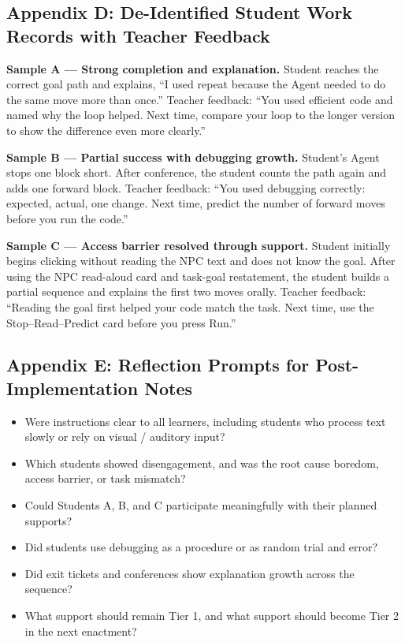 \documentclass[12pt]{article}
\begin{document}
\subsection{Appendix D: De-Identified Student Work Records with Teacher Feedback}
\textbf{Sample A --- Strong completion and explanation.} Student reaches the correct goal path and explains, ``I used repeat because the Agent needed to do the same move more than once.'' Teacher feedback: ``You used efficient code and named why the loop helped. Next time, compare your loop to the longer version to show the difference even more clearly.''

\textbf{Sample B --- Partial success with debugging growth.} Student's Agent stops one block short. After conference, the student counts the path again and adds one forward block. Teacher feedback: ``You used debugging correctly: expected, actual, one change. Next time, predict the number of forward moves before you run the code.''

\textbf{Sample C --- Access barrier resolved through support.} Student initially begins clicking without reading the NPC text and does not know the goal. After using the NPC read-aloud card and task-goal restatement, the student builds a partial sequence and explains the first two moves orally. Teacher feedback: ``Reading the goal first helped your code match the task. Next time, use the Stop--Read--Predict card before you press Run.''

\subsection{Appendix E: Reflection Prompts for Post-Implementation Notes}
\begin{itemize}
\item Were instructions clear to all learners, including students who process text slowly or rely on visual / auditory input?
\item Which students showed disengagement, and was the root cause boredom, access barrier, or task mismatch?
\item Could Students A, B, and C participate meaningfully with their planned supports?
\item Did students use debugging as a procedure or as random trial and error?
\item Did exit tickets and conferences show explanation growth across the sequence?
\item What support should remain Tier 1, and what support should become Tier 2 in the next enactment?
\end{itemize}
\end{document}
